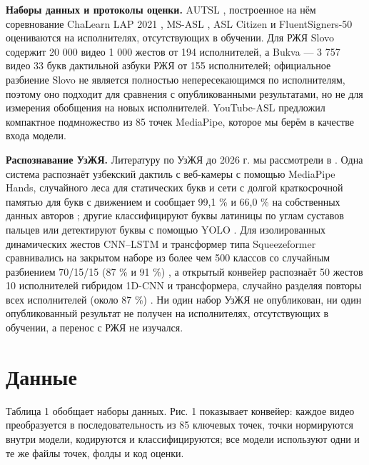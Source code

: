 \textbf{Наборы данных и протоколы оценки.} AUTSL \citep{2020_sincan_autsl}, построенное на нём соревнование ChaLearn LAP 2021 \citep{2021_sincan_chalearn_lap_islr}, MS-ASL \citep{2019_joze_msasl}, ASL Citizen \citep{2023_desai_asl_citizen} и FluentSigners-50 \citep{2022_mukushev_fluentsigners50} оцениваются на исполнителях, отсутствующих в обучении. Для РЖЯ Slovo \citep{2023_kapitanov_slovo} содержит 20 000 видео 1 000 жестов от 194 исполнителей, а Bukva \citep{2024_kvanchiani_bukva} --- 3 757 видео 33 букв дактильной азбуки РЖЯ от 155 исполнителей; официальное разбиение Slovo не является полностью непересекающимся по исполнителям, поэтому оно подходит для сравнения с опубликованными результатами, но не для измерения обобщения на новых исполнителей. YouTube-ASL \citep{2023_uthus_youtube_asl} предложил компактное подмножество из 85 точек MediaPipe, которое мы берём в качестве входа модели.

\textbf{Распознавание УзЖЯ.} Литературу по УзЖЯ до 2026 г. мы рассмотрели в \citep{2026_onarkulov_slr_review_uzsl}. Одна система распознаёт узбекский дактиль с веб-камеры с помощью MediaPipe Hands, случайного леса для статических букв и сети с долгой краткосрочной памятью для букв с движением и сообщает 99,1 \% и 66,0 \% на собственных данных авторов \citep{2026_jovlieva_webcam_uzbek_fingerspelling}; другие классифицируют буквы латиницы по углам суставов пальцев \citep{2024_kayumov_uzsl_latin_angular_signs} или детектируют буквы с помощью YOLO \citep{2024_akhmedov_uzsl_dactyl_yolo}. Для изолированных динамических жестов CNN--LSTM и трансформер типа Squeezeformer сравнивались на закрытом наборе из более чем 500 классов со случайным разбиением 70/15/15 (87 \% и 91 \%) \citep{2026_ergashev_cnnlstm_vs_squeezeformer_uzsl}, а открытый конвейер распознаёт 50 жестов 10 исполнителей гибридом 1D-CNN и трансформера, случайно разделяя повторы всех исполнителей (около 87 \%) \citep{2025_akkomron_uzslr_isolated_dynamic}. Ни один набор УзЖЯ не опубликован, ни один опубликованный результат не получен на исполнителях, отсутствующих в обучении, а перенос с РЖЯ не изучался.

\hypertarget{ux434ux430ux43dux43dux44bux435}{%
\section{Данные}\label{ux434ux430ux43dux43dux44bux435}}

Таблица 1 обобщает наборы данных. Рис. 1 показывает конвейер: каждое видео преобразуется в последовательность из 85 ключевых точек, точки нормируются внутри модели, кодируются и классифицируются; все модели используют одни и те же файлы точек, фолды и код оценки.

